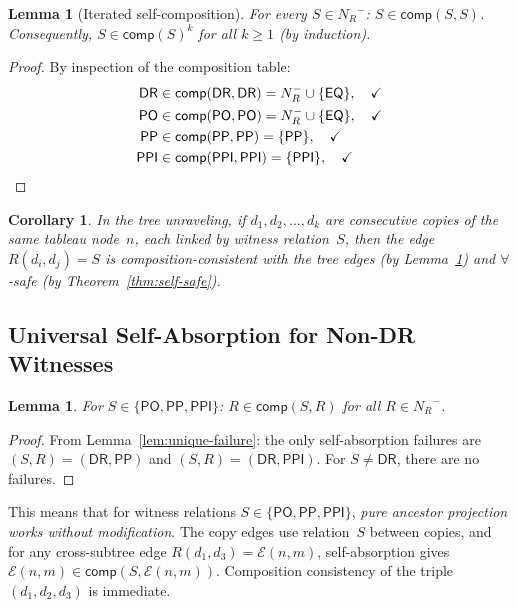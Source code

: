 \documentclass[a4paper,11pt]{article}
\newtheorem{lemma}[theorem]{Lemma}
\newtheorem{corollary}[theorem]{Corollary}
\theoremstyle{definition}
\newcommand{\NR}{\ensuremath{N_R}}
\newcommand{\DR}{\ensuremath{\mathsf{DR}}}
\newcommand{\PO}{\ensuremath{\mathsf{PO}}}
\newcommand{\EQ}{\ensuremath{\mathsf{EQ}}}
\newcommand{\PP}{\ensuremath{\mathsf{PP}}}
\newcommand{\PPI}{\ensuremath{\mathsf{PPI}}}
\newcommand{\comp}{\ensuremath{\mathsf{comp}}}
\begin{document}
\begin{lemma}[Iterated self-composition]
\label{lem:iterated-comp}
For every $S \in \NR^{-}$: $S \in \comp(S, S)$.  Consequently,
$S \in \comp(S)^k$ for all $k \geq 1$ \textup{(}by induction\textup{)}.
\end{lemma}

\begin{proof}
By inspection of the composition table:
\begin{align*}
  \DR &\in \comp(\DR, \DR) = \NR^{-} \cup \{\EQ\}, \quad\checkmark \\
  \PO &\in \comp(\PO, \PO) = \NR^{-} \cup \{\EQ\}, \quad\checkmark \\
  \PP &\in \comp(\PP, \PP) = \{\PP\}, \quad\checkmark \\
  \PPI &\in \comp(\PPI, \PPI) = \{\PPI\}, \quad\checkmark \qedhere
\end{align*}
\end{proof}

\begin{corollary}
\label{cor:copy-edge}
In the tree unraveling, if $d_1, d_2, \ldots, d_k$ are consecutive
copies of the same tableau node~$n$, each linked by witness
relation~$S$, then the edge $R(d_i, d_j) = S$ is
composition-consistent with the tree edges \textup{(}by
Lemma~\ref{lem:iterated-comp}\textup{)} and $\forall$-safe
\textup{(}by Theorem~\ref{thm:self-safe}\textup{)}.
\end{corollary}

\subsection{Universal Self-Absorption for Non-DR Witnesses}

\begin{lemma}
\label{lem:non-DR-ok}
For $S \in \{\PO, \PP, \PPI\}$: $R \in \comp(S, R)$ for all $R \in
\NR^{-}$.
\end{lemma}

\begin{proof}
From Lemma~\ref{lem:unique-failure}: the only self-absorption
failures are $(S, R) = (\DR, \PP)$ and $(S, R) = (\DR, \PPI)$.  For
$S \neq \DR$, there are no failures.
\end{proof}

This means that for witness relations $S \in \{\PO, \PP, \PPI\}$,
\emph{pure ancestor projection works without modification}.  The copy
edges use relation~$S$ between copies, and for any cross-subtree edge
$R(d_1, d_3) = \mathcal{E}(n, m)$, self-absorption gives
$\mathcal{E}(n, m) \in \comp(S, \mathcal{E}(n, m))$.  Composition
consistency of the triple $(d_1, d_2, d_3)$ is immediate.
\end{document}
